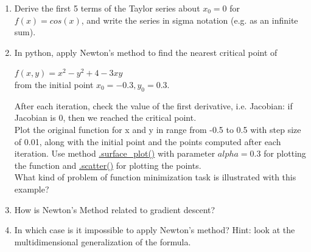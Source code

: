 \begin{exercise}

    \begin{enumerate}
    \item Derive the first 5 terms of the Taylor series about $x_0 = 0$ for $f(x) = cos(x)$, and write the series in sigma notation (e.g. as an infinite sum).
    
    \item In python, apply Newton's method to find the nearest critical point of \\
    \begin{center} $f(x, y) = x^2 - y^2 + 4 - 3xy$\\
    from the initial point $x_0 = -0.3, y_0 = 0.3$.\\ \end{center}
    After each iteration, check the value of the first derivative, i.e. Jacobian: if Jacobian is 0, then we reached the critical point.\\
    Plot the original function for x and y in range from -0.5 to 0.5 with step size of 0.01, along with the initial point and the points computed after each iteration.
    Use method \href{https://matplotlib.org/3.1.0/gallery/mplot3d/surface3d.html}{.surface\_plot()} with parameter $alpha=0.3$ for plotting the function and \href{https://matplotlib.org/mpl_toolkits/mplot3d/tutorial.html}{.scatter()} for plotting the points. \\
	What kind of problem of function minimization task is illustrated with this example?
    
    \item How is Newton’s Method related to gradient descent?
    
	\item In which case is it impossible to apply Newton's method? Hint: look at the multidimensional generalization of the formula.
	
	
    
  \end{enumerate}
    
\end{exercise}


